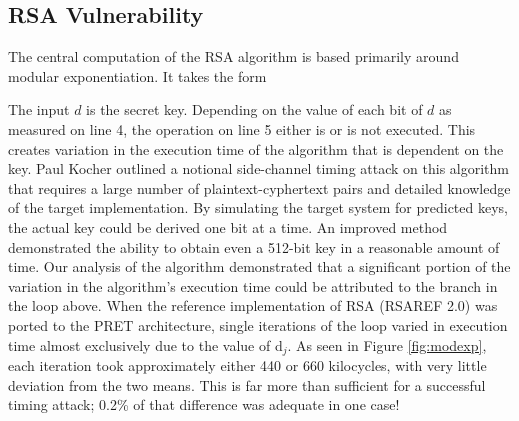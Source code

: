 \documentclass[times, 10pt,twocolumn]{article}
\begin{document}
\subsection{RSA Vulnerability}
The central computation of the RSA algorithm is based primarily around modular exponentiation.  It takes the form 

\begin{center}\end{center}

The input $d$ is the secret key.  Depending on the value of each bit of $d$ as measured on line 4, the operation on line 5 either is or is not executed.  This creates variation in the execution time of the algorithm that is dependent on the key.  Paul Kocher outlined\cite{Kocher96timingattacks} a notional side-channel timing attack on this algorithm that requires a large number of plaintext-cyphertext pairs and detailed knowledge of the target implementation.  By simulating the target system for predicted keys, the actual key could be derived one bit at a time.  An improved method \cite{DKLMQW98} demonstrated the ability to obtain even a 512-bit key in a reasonable amount of time.  Our analysis of the algorithm demonstrated that a significant portion of the variation in the algorithm's execution time could be attributed to the branch in the loop above.  When the reference implementation of RSA (RSAREF 2.0) was ported to the PRET architecture, single iterations of the loop varied in execution time almost exclusively due to the value of d$_{j}$.  As seen in Figure \ref{fig:modexp}, each iteration took approximately either 440 or 660 kilocycles, with very little deviation from the two means.  This is far more than sufficient for a successful timing attack; 0.2\% of that difference was adequate in one case! \cite{DKLMQW98}
\end{document}
